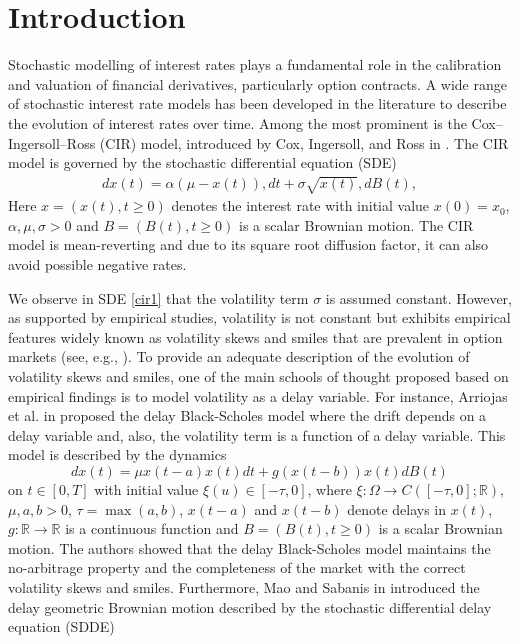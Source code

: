 \documentclass[11pt]{article}
\begin{document}
\section{Introduction}
Stochastic modelling of interest rates plays a fundamental role in the calibration and valuation of financial derivatives, particularly option contracts. A wide range of stochastic interest rate models has been developed in the literature to describe the evolution of interest rates over time. Among the most prominent is the Cox–Ingersoll–Ross (CIR) model, introduced by Cox, Ingersoll, and Ross in \cite{CIR}. The CIR model is governed by the stochastic differential equation (SDE)
\begin{align}\label{cir1}
dx(t) = \alpha(\mu - x(t)),dt + \sigma \sqrt{x(t)},dB(t),
\end{align}
Here $x=(x(t),t\geq0)$ denotes the interest rate with initial value $x(0)=x_0$, $\alpha,\mu,\sigma>0$ and $B=(B(t),t\ge 0)$ is a scalar Brownian motion. The CIR model is mean-reverting and due to its square root diffusion factor, it can also avoid possible negative rates. 
\par
We observe in SDE \eqref{cir1} that the volatility term $\sigma$ is assumed constant. However, as supported by empirical studies, volatility is not constant but exhibits empirical features widely known as volatility skews and smiles that are prevalent in option markets (see, e.g., \cite{Heston, Gatheral}). To provide an adequate description of the evolution of volatility skews and smiles, one of the main schools of thought proposed based on empirical findings is to model volatility as a delay variable. For instance, Arriojas et al. in \cite{Arriojas} proposed the delay Black-Scholes model where the drift depends on a delay variable and, also, the volatility term is a function of a delay variable. This model is described by the dynamics
\begin{equation}
dx(t)=\mu x(t-a)x(t)dt+g(x(t-b))x(t)dB(t)
\end{equation}
on $t\in[0,T]$ with initial value $\xi(u)\in [-\tau,0]$, where $\xi:\Omega\rightarrow C([-\tau,0];\mathbb{R})$, $\mu,a,b>0$, $\tau=\max(a,b)$, $x(t-a)$ and $x(t-b)$ denote delays in $x(t)$, $g:\mathbb{R}\rightarrow \mathbb{R}$ is a continuous function and $B=(B(t),t\ge 0)$ is a scalar Brownian motion. The authors showed that the delay Black-Scholes model maintains the no-arbitrage property and the completeness of the market with the correct volatility skews and smiles. Furthermore, Mao and Sabanis in \cite{sabanis} introduced the delay geometric Brownian motion described by the stochastic differential delay equation (SDDE)
\end{document}
